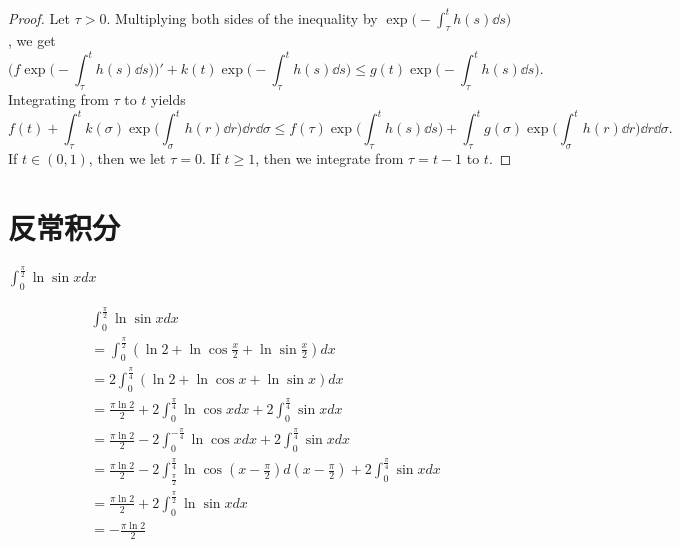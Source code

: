 \begin{proof}
  Let $\tau > 0$. 
  Multiplying both sides of the inequality by $\exp\big(-\int_\tau^th(s)\dd s\big)$, 
  we get 
  \begin{equation*}
    \bigg(f\exp\Big(-\int_\tau^th(s)\dd s\Big)\bigg)'
    + k(t)\exp\bigg(-\int_\tau^th(s)\dd s\bigg) 
    \le g(t)\exp\bigg(-\int_\tau^th(s)\dd s\bigg).
  \end{equation*}
  Integrating from $\tau$ to $t$ yields 
  \begin{equation*}
    f(t) 
    + \int_\tau^t k(\sigma)\exp\bigg(\int_\sigma^th(r)\dd r\bigg)\dd r\dd\sigma
    \leq f(\tau)\exp\bigg(\int_\tau^th(s)\dd s\bigg)
    + \int_\tau^t g(\sigma)\exp\bigg(\int_\sigma^th(r)\dd r\bigg)\dd r\dd\sigma.
  \end{equation*}
  If $t\in(0,1)$, then we let $\tau=0$.
  If $t\geq1$, then we integrate from $\tau=t-1$ to $t$.
\end{proof}
 
\section{反常积分}

  \begin{example}
    $\int_0^{\frac {\pi}2}\ln\sin xdx$
  \end{example}
  
  \begin{solution}
  \begin{align*}
  &\int_0^{\frac{\pi}{2}}\ln\sin xdx\\
  &=\int_0^{\frac{\pi}{2}}(\ln2+\ln\cos\frac{x}{2}+\ln\sin\frac{x}{2})dx\\
  &=2\int_0^{\frac{\pi}{4}}(\ln2+\ln\cos x+\ln\sin x)dx\\
  &=\frac{\pi\ln2}{2}+2\int_0^{\frac{\pi}{4}}\ln\cos xdx+2\int_0^{\frac{\pi}{4}}\sin xdx\\
  &=\frac{\pi\ln2}{2}-2\int_0^{-\frac{\pi}{4}}\ln\cos xdx+2\int_0^{\frac{\pi}{4}}\sin xdx\\
  &=\frac{\pi\ln2}{2}-2\int_{\frac{\pi}{2}}^{\frac{\pi}{4}}\ln\cos(x-\frac{\pi}{2})d(x-\frac{\pi}{2})+2\int_0^{\frac{\pi}{4}}\sin xdx\\
  &=\frac{\pi\ln2}{2}+2\int_0^{\frac{\pi}{2}}\ln\sin xdx\\
  &=-\frac{\pi\ln2}{2}
  \end{align*}
\end{solution}
  
